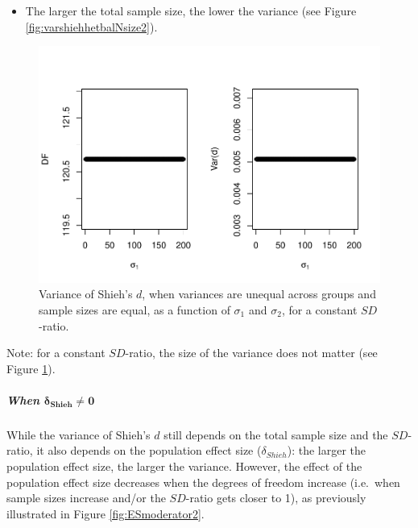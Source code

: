 \documentclass[
  english,
  man,mask]{apa6}
\providecommand{\tightlist}{%
  \setlength{\itemsep}{0pt}\setlength{\parskip}{0pt}}
\let\oldsubparagraph\subparagraph
\renewcommand{\subparagraph}[1]{\oldsubparagraph{#1}\mbox{}}
\begin{document}
\begin{itemize}
\tightlist
\item
  The larger the total sample size, the lower the variance (see Figure \ref{fig:varshiehhetbalNsize2}).
\end{itemize}

\begin{figure}
\centering
\includegraphics{Theoretical-Bias-of-all-estimators-as-a-function-of-population-parameters_files/figure-latex/varshiehhetbalvariance2-1.pdf}
\caption{\label{fig:varshiehhetbalvariance2}Variance of Shieh's \(d\), when variances are unequal across groups and sample sizes are equal, as a function of \(\sigma_1\) and \(\sigma_2\), for a constant \(SD\)-ratio.}
\end{figure}

Note: for a constant \(SD\)-ratio, the size of the variance does not matter (see Figure \ref{fig:varshiehhetbalvariance2}).

\hypertarget{when-bmdelta_shieh-neq-0-1}{%
\subparagraph{\texorpdfstring{When \(\bm{\delta_{Shieh} \neq 0}\)}{When \textbackslash bm\{\textbackslash delta\_\{Shieh\} \textbackslash neq 0\}}}\label{when-bmdelta_shieh-neq-0-1}}

While the variance of Shieh's \(d\) still depends on the total sample size and the \(SD\)-ratio, it also depends on the population effect size (\(\delta_{Shieh}\)): the larger the population effect size, the larger the variance. However, the effect of the population effect size decreases when the degrees of freedom increase (i.e.~when sample sizes increase and/or the \(SD\)-ratio gets closer to 1), as previously illustrated in Figure \ref{fig:ESmoderator2}.
\end{document}
